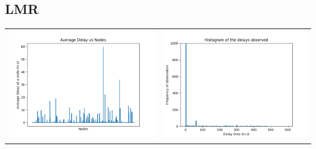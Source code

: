 \documentclass[twoside,11pt]{article}
\begin{document}
\subsection{LMR}

\begin{tabular}{cc}

\includegraphics[scale=0.4]{img/LMR/alpha=3000/figure_1.png} 
&
\includegraphics[scale=0.4]{img/LMR/alpha=3000/figure_1-1.png} \\


\end{tabular}
\end{document}
